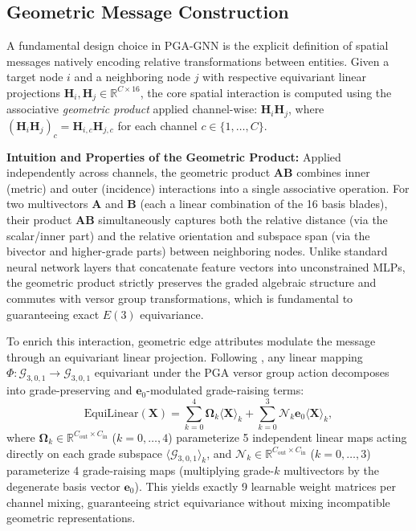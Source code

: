 \documentclass[10pt]{article}
\begin{document}
\subsection{Geometric Message Construction}
\label{subsec:message}

A fundamental design choice in PGA-GNN is the explicit definition of spatial messages natively encoding relative transformations between entities. 
Given a target node $i$ and a neighboring node $j$ with respective equivariant linear projections $\mathbf{H}_i, \mathbf{H}_j \in \mathbb{R}^{C \times 16}$, the core spatial interaction is computed using the associative \emph{geometric product} applied channel-wise: $\mathbf{H}_i \mathbf{H}_j$, where $(\mathbf{H}_i \mathbf{H}_j)_c = \mathbf{H}_{i,c} \mathbf{H}_{j,c}$ for each channel $c \in \{1, \dots, C\}$.

\noindent
\textbf{Intuition and Properties of the Geometric Product:} 
Applied independently across channels, the geometric product $\mathbf{A} \mathbf{B}$ combines inner (metric) and outer (incidence) interactions into a single associative operation. 
For two multivectors $\mathbf{A}$ and $\mathbf{B}$ (each a linear combination of the 16 basis blades), their product $\mathbf{A} \mathbf{B}$ simultaneously captures both the relative distance (via the scalar/inner part) and the relative orientation and subspace span (via the bivector and higher-grade parts) between neighboring nodes. 
Unlike standard neural network layers that concatenate feature vectors into unconstrained MLPs, the geometric product strictly preserves the graded algebraic structure and commutes with versor group transformations, which is fundamental to guaranteeing exact $E(3)$ equivariance.

\noindent
To enrich this interaction, geometric edge attributes modulate the message through an equivariant linear projection. Following \citet{gatr}, any linear mapping $\Phi: \mathcal{G}_{3,0,1} \to \mathcal{G}_{3,0,1}$ equivariant under the PGA versor group action decomposes into grade-preserving and $\mathbf{e}_0$-modulated grade-raising terms:
\begin{equation}
    \mathrm{EquiLinear}(\mathbf{X}) = \sum_{k=0}^{4} \boldsymbol{\Omega}_k \langle \mathbf{X} \rangle_k + \sum_{k=0}^{3} \boldsymbol{\mathcal{N}}_k \mathbf{e}_0 \langle \mathbf{X} \rangle_k,
    \label{eq:equilinear}
\end{equation}
where $\boldsymbol{\Omega}_k \in \mathbb{R}^{C_{\text{out}} \times C_{\text{in}}}$ ($k=0,\dots,4$) parameterize 5 independent linear maps acting directly on each grade subspace $\langle \mathcal{G}_{3,0,1} \rangle_k$, and $\boldsymbol{\mathcal{N}}_k \in \mathbb{R}^{C_{\text{out}} \times C_{\text{in}}}$ ($k=0,\dots,3$) parameterize 4 grade-raising maps (multiplying grade-$k$ multivectors by the degenerate basis vector $\mathbf{e}_0$). This yields exactly 9 learnable weight matrices per channel mixing, guaranteeing strict equivariance without mixing incompatible geometric representations.
\end{document}
